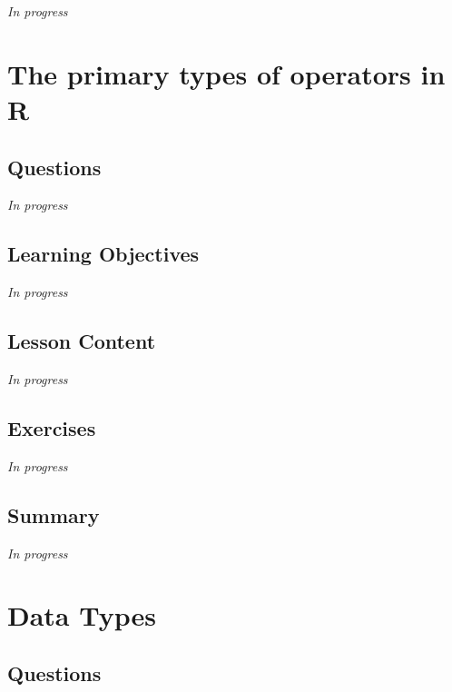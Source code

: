 \documentclass[
  letterpaper,
  DIV=11,
  numbers=noendperiod]{scrreprt}
\begin{document}
\emph{In progress}


\hypertarget{sec-operators}{%
\chapter{The primary types of operators in R}\label{sec-operators}}

\hypertarget{questions-6}{%
\section{Questions}\label{questions-6}}

\emph{In progress}

\hypertarget{learning-objectives-6}{%
\section{Learning Objectives}\label{learning-objectives-6}}

\emph{In progress}

\hypertarget{lesson-content-6}{%
\section{Lesson Content}\label{lesson-content-6}}

\emph{In progress}

\hypertarget{exercises-6}{%
\section{Exercises}\label{exercises-6}}

\emph{In progress}

\hypertarget{summary-7}{%
\section{Summary}\label{summary-7}}

\emph{In progress}


\hypertarget{sec-data-types}{%
\chapter{Data Types}\label{sec-data-types}}

\hypertarget{questions-7}{%
\section{Questions}\label{questions-7}}
\end{document}
